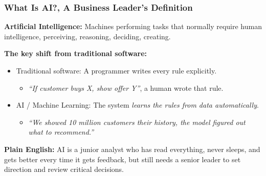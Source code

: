%

\begin{frame}[fragile]\frametitle{What Is AI?, A Business Leader's Definition}

\textbf{Artificial Intelligence:} Machines performing tasks that normally require human intelligence, perceiving, reasoning, deciding, creating.

\vspace{0.5em}
\textbf{The key shift from traditional software:}
\begin{itemize}
  \item Traditional software: A programmer writes every rule explicitly.
  \begin{itemize}
    \item \textit{``If customer buys X, show offer Y''}, a human wrote that rule.
  \end{itemize}
  \item AI / Machine Learning: The system \textit{learns the rules from data automatically}.
  \begin{itemize}
    \item \textit{``We showed 10 million customers their history, the model figured out what to recommend.''}
  \end{itemize}
\end{itemize}

\vspace{0.3em}
\textbf{Plain English:} AI is a junior analyst who has read everything, never sleeps, and gets better every time it gets feedback, but still needs a senior leader to set direction and review critical decisions.

\end{frame}

